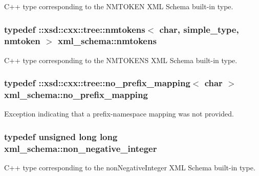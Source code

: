 C++ type corresponding to the N\+M\+T\+O\+K\+E\+N X\+M\+L Schema built-\/in type. 

\hypertarget{namespacexml__schema_af680cdfd739686fb9b689667435092f8}{
\subsubsection[{nmtokens}]{\setlength{\rightskip}{0pt plus 5cm}typedef \+::xsd\+::cxx\+::tree\+::nmtokens$<$ char, {\bf simple\+\_\+type}, {\bf nmtoken} $>$ {\bf xml\+\_\+schema\+::nmtokens}}}\label{namespacexml__schema_af680cdfd739686fb9b689667435092f8}


C++ type corresponding to the N\+M\+T\+O\+K\+E\+N\+S X\+M\+L Schema built-\/in type. 

\hypertarget{namespacexml__schema_a03293581f2c90a05fbb910be49380e01}{
\subsubsection[{no\+\_\+prefix\+\_\+mapping}]{\setlength{\rightskip}{0pt plus 5cm}typedef \+::xsd\+::cxx\+::tree\+::no\+\_\+prefix\+\_\+mapping$<$ char $>$ {\bf xml\+\_\+schema\+::no\+\_\+prefix\+\_\+mapping}}}\label{namespacexml__schema_a03293581f2c90a05fbb910be49380e01}


Exception indicating that a prefix-\/namespace mapping was not provided. 

\hypertarget{namespacexml__schema_af42ef5911d65f41a0a03598b056f05aa}{
\subsubsection[{non\+\_\+negative\+\_\+integer}]{\setlength{\rightskip}{0pt plus 5cm}typedef unsigned long long {\bf xml\+\_\+schema\+::non\+\_\+negative\+\_\+integer}}}\label{namespacexml__schema_af42ef5911d65f41a0a03598b056f05aa}


C++ type corresponding to the non\+Negative\+Integer X\+M\+L Schema built-\/in type. 

